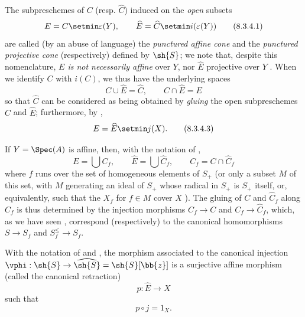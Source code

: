 \begin{env}[8.3.4]
\label{II.8.3.4}
The subpreschemes of $C$ (resp. $\widehat{C}$) induced on the \emph{open} subsets
\[
\label{II.8.3.4.1}
  E = C \setmin \varepsilon(Y),
  \qquad
  \widehat{E} = \widehat{C} \setmin i(\varepsilon(Y))
\tag{8.3.4.1}
\]
are called (by an abuse of language) the \emph{punctured affine cone} and the \emph{punctured projective cone} (respectively) defined by $\sh{S}$;
we note that, despite this nomenclature, \emph{$E$ is not necessarily affine} over $Y$, nor $\widehat{E}$ projective over $Y$ .
When we identify $C$ with $i(C)$, we thus have the underlying spaces
\[
\label{II.8.3.4.2}
  C \cup \widehat{E} = \widehat{C},
  \qquad
  C \cap \widehat{E} = E
\tag{8.3.4.2}
\]
so that $\widehat{C}$ can be considered as being obtained by \emph{gluing} the open subpreschemes $C$ and $\widehat{E}$;
furthermore, by ,
\[
\label{II.8.3.4.3}
  E = \widehat{E} \setmin j(X).
\tag{8.3.4.3}
\]

If $Y=\Spec(A)$ is affine, then, with the notation of ,
\[
\label{II.8.3.4.4}
  E = \bigcup C_f,
  \qquad
  \widehat{E} = \bigcup \widehat{C}_f,
  \qquad
  C_f = C \cap \widehat{C}_f
\tag{8.3.4.4}
\]
where $f$ runs over the set of homogeneous elements of $S_+$ (or only a subset $M$ of this set, with $M$ generating an ideal of $S_+$ whose radical in $S_+$ is $S_+$ itself, or, equivalently, such that the $X_f$ for $f\in M$ cover $X$ ).
The gluing of $C$ and $\widehat{C}_f$ along $C_f$ is thus determined by the injection morphisms $C_f\to C$ and $C_f\to\widehat{C}_f$, which, as we have seen , correspond (respectively) to the canonical homomorphisms $S\to S_f$ and $S_f^\leq\to S_f$.
\end{env}

\begin{proposition}[8.3.5]
\label{II.8.3.5}
With the notation of  and , the morphism associated  to the canonical injection $\vphi:\sh{S} \to \widehat{\sh{S}} = \sh{S}[\bb{z}]$ is a surjective affine morphism (called the canonical retraction)
\[
\label{II.8.3.5.1}
  p:\widehat{E} \to X
\tag{8.3.5.1}
\]
such that
\[
\label{II.8.3.5.2}
  p \circ j = 1_X.
\tag{8.3.5.2}
\]
\end{proposition}

